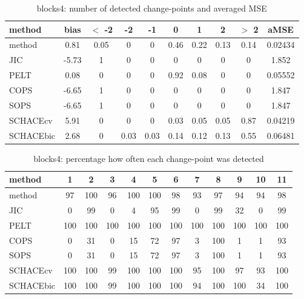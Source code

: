 \begin{table}[ht]
\centering
\begin{tabular}{l|c|ccccccc|c}
  \hline
method & bias & $<$ -2 & -2 & -1 & 0 & 1 & 2 & $>$ 2 & aMSE \\ 
  \hline
method &  0.81 &  0.05 &     0 &     0 &  0.46 &  0.22 &  0.13 &  0.14 & 0.02434 \\ 
  JIC & -5.73 &     1 &     0 &     0 &     0 &     0 &     0 &     0 & 1.852 \\ 
  PELT &  0.08 &     0 &     0 &     0 &  0.92 &  0.08 &     0 &     0 & 0.05552 \\ 
  COPS & -6.65 &     1 &     0 &     0 &     0 &     0 &     0 &     0 & 1.847 \\ 
  SOPS & -6.65 &     1 &     0 &     0 &     0 &     0 &     0 &     0 & 1.847 \\ 
  SCHACEcv &  5.91 &     0 &     0 &     0 &  0.03 &  0.05 &  0.05 &  0.87 & 0.04219 \\ 
  SCHACEbic &  2.68 &     0 &  0.03 &  0.03 &  0.14 &  0.12 &  0.13 &  0.55 & 0.06481 \\ 
   \hline
\end{tabular}
\caption{blocks4: number of detected change-points and averaged MSE} 
\label{tab:blocks4Njumps}
\end{table}
\begin{table}[ht]
\centering
\begin{tabular}{l|ccccccccccc}
  \hline
method & 1 & 2 & 3 & 4 & 5 & 6 & 7 & 8 & 9 & 10 & 11 \\ 
  \hline
method &     97 &    100 &     96 &    100 &    100 &     98 &     93 &     97 &     94 &     94 &     98 \\ 
  JIC &      0 &     99 &      0 &      4 &     95 &     99 &      0 &     99 &     32 &      0 &     99 \\ 
  PELT &    100 &    100 &    100 &    100 &    100 &    100 &    100 &    100 &    100 &    100 &    100 \\ 
  COPS &      0 &     31 &      0 &     15 &     72 &     97 &      3 &    100 &      1 &      1 &     93 \\ 
  SOPS &      0 &     31 &      0 &     15 &     72 &     97 &      3 &    100 &      1 &      1 &     93 \\ 
  SCHACEcv &    100 &    100 &     99 &    100 &    100 &    100 &     95 &    100 &     97 &     93 &    100 \\ 
  SCHACEbic &    100 &    100 &     99 &    100 &    100 &    100 &     94 &    100 &    100 &     34 &    100 \\ 
   \hline
\end{tabular}
\caption{blocks4: percentage how often each change-point was detected} 
\label{tab:blocks4Detections}
\end{table}
